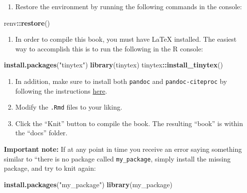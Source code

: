 \documentclass[]{book}
\newenvironment{Shaded}{\begin{snugshade}}{\end{snugshade}}
\newcommand{\KeywordTok}[1]{\textcolor[rgb]{0.13,0.29,0.53}{\textbf{#1}}}
\newcommand{\StringTok}[1]{\textcolor[rgb]{0.31,0.60,0.02}{#1}}
\newcommand{\OperatorTok}[1]{\textcolor[rgb]{0.81,0.36,0.00}{\textbf{#1}}}
\newcommand{\NormalTok}[1]{#1}
\providecommand{\tightlist}{%
  \setlength{\itemsep}{0pt}\setlength{\parskip}{0pt}}
\begin{document}
\begin{enumerate}
\def\labelenumi{\arabic{enumi}.}
\setcounter{enumi}{9}
\tightlist
\item
  Restore the environment by running the following commands in the
  console:
\end{enumerate}

\begin{Shaded}
\begin{Highlighting}[]
\NormalTok{renv}\OperatorTok{::}\KeywordTok{restore}\NormalTok{()}
\end{Highlighting}
\end{Shaded}

\begin{enumerate}
\def\labelenumi{\arabic{enumi}.}
\setcounter{enumi}{10}
\tightlist
\item
  In order to compile this book, you must have LaTeX installed. The
  easiest way to accomplish this is to run the following in the R
  console:
\end{enumerate}

\begin{Shaded}
\begin{Highlighting}[]
\KeywordTok{install.packages}\NormalTok{(}\StringTok{"tinytex"}\NormalTok{)}
\KeywordTok{library}\NormalTok{(tinytex)}
\NormalTok{tinytex}\OperatorTok{::}\KeywordTok{install_tinytex}\NormalTok{()}
\end{Highlighting}
\end{Shaded}

\begin{enumerate}
\def\labelenumi{\arabic{enumi}.}
\setcounter{enumi}{11}
\item
  In addition, make sure to install both \texttt{pandoc} and
  \texttt{pandoc-citeproc} by following the instructions
  \href{https://pandoc.org/installing.html}{here}.
\item
  Modify the \texttt{.Rmd} files to your liking.
\item
  Click the ``Knit'' button to compile the book. The resulting ``book''
  is within the ``docs'' folder.
\end{enumerate}

\textbf{Important note:} If at any point in time you receive an error
saying something similar to ``there is no package called
\texttt{my\_package}, simply install the missing package, and try to
knit again:

\begin{Shaded}
\begin{Highlighting}[]
\KeywordTok{install.packages}\NormalTok{(}\StringTok{"my_package"}\NormalTok{)}
\KeywordTok{library}\NormalTok{(my_package)}
\end{Highlighting}
\end{Shaded}
\end{document}
